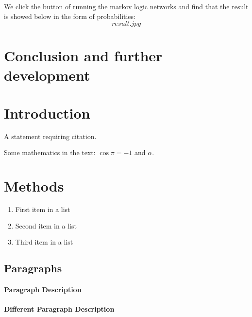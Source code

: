 \documentclass[
12pt, %
a4paper, %
oneside, %
headinclude,footinclude, %
BCOR5mm, %
]{scrartcl}
\begin{document}
We click the button of running the markov logic networks and find that the result is showed below in the form of probabilities:
$$
result.jpg
$$

\section{Conclusion and further development}

\section{Introduction}

A statement requiring citation.

\lipsum[1-3] %

Some mathematics in the text: $\cos\pi=-1$ and $\alpha$.
 

\section{Methods}

\lipsum[5] %

\begin{enumerate}[noitemsep] %
\item First item in a list
\item Second item in a list
\item Third item in a list
\end{enumerate}


\subsection{Paragraphs}

\lipsum[6] %

\paragraph{Paragraph Description} \lipsum[7] %

\paragraph{Different Paragraph Description} \lipsum[8] %
\end{document}
